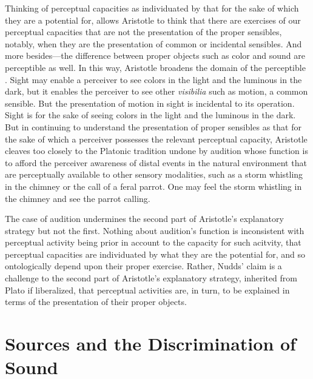 Thinking of perceptual capacities as individuated by that for the sake of which they are a potential for, allows Aristotle to think that there are exercises of our perceptual capacities that are not the presentation of the proper sensibles, notably, when they are the presentation of common or incidental sensibles. And more besides---the difference between proper objects such as color and sound are perceptible as well. In this way, Aristotle broadens the domain of the perceptible \citep{Sorabji:1971fr,Sorabji:2003fk}. Sight may enable a perceiver to see colors in the light and the luminous in the dark, but it enables the perceiver to see other \emph{visibilia} such as motion, a common sensible. But the presentation of motion in sight is incidental to its operation. Sight is for the sake of seeing colors in the light and the luminous in the dark. But in continuing to understand the presentation of proper sensibles as that for the sake of which a perceiver possesses the relevant perceptual capacity, Aristotle cleaves too closely to the Platonic tradition undone by audition whose function is to afford the perceiver awareness of distal events in the natural environment that are perceptually available to other sensory modalities, such as a storm whistling in the chimney or the call of a feral parrot. One may feel the storm whistling in the chimney and see the parrot calling.

The case of audition undermines the second part of Aristotle's explanatory strategy but not the first. Nothing about audition's function is inconsistent with perceptual activity being prior in account to the capacity for such acitvity, that perceptual capacities are individuated by what they are the potential for, and so ontologically depend upon their proper exercise. Rather, Nudds' claim is a challenge to the second part of Aristotle's explanatory strategy, inherited from Plato if liberalized, that perceptual activities are, in turn, to be explained in terms of the presentation of their proper objects.


\section{Sources and the Discrimination of Sound} %
\label{sec:sources_and_the_discrimination_of_sound}


